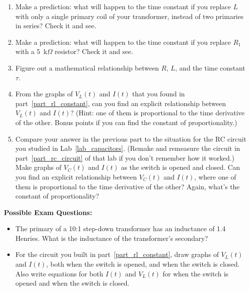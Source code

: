 \begin{enumerate}[wide]
\item Make a prediction: what will happen to the time constant if you replace $L$ with only a single primary coil of your transformer, instead of two primaries in series?  Check it and see.    

\item Make a prediction: what will happen to the time constant if you replace $R_1$ with a 5~k$\Omega$ resistor?  Check it and see.

\item Figure out a mathematical relationship between $R$, $L$, and the time constant $\tau$.

\item From the graphs of $V_{L}(t)$ and $I(t)$ that you found in part~\ref{part_rl_constant}, can you find an explicit relationship between  $V_{L}(t)$ and $I(t)$?  (Hint: one of them is proportional to the time derivative of the other.  Bonus points if you can find the constant of proportionality.)

\item Compare your answer in the previous part to the situation for the RC circuit you studied in Lab~\ref{lab_capacitors}.  (Remake and remeasure the circuit in part~\ref{part_rc_circuit} of that lab if you don't remember how it worked.)  Make graphs of $V_{C}(t)$ and $I(t)$ as the switch is opened and closed.  Can you find an explicit relationship between $V_{C}(t)$ and $I(t)$, where one of them is proportional to the time derivative of the other?  Again, what's the constant of proportionality?


\end{enumerate}

\textbf{Possible Exam Questions:}

\begin{itemize}
\item The primary of a 10:1 step-down transformer has an inductance of 1.4 Henries.  What is the inductance of the transformer's secondary?


\item For the circuit you built in part~\ref{part_rl_constant}, draw graphs of $V_L(t)$ and $I(t)$, both when the switch is opened, and when the switch is closed.  Also write equations for both $I(t)$ and $V_L(t)$ for when the switch is opened and when the switch is closed.

\end{itemize}






